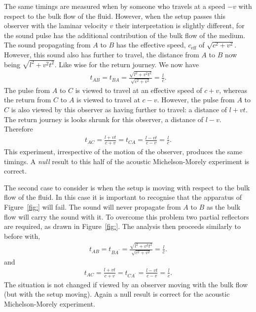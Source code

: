 \documentclass[10pt, fleqn,draft,showtrims,oldfontcommands]{article} %
\newcommand{\figref}[1]{Figure~\ref{fig:#1}}
\newcommand{\eff}{{\textrm{eff}}}
\begin{document}
The same timings are measured when by someone who travels at a speed $-v$ with respect to the bulk flow of the fluid.
However, when the setup passes this observer with the laminar velocity $v$ their interpretation is slightly different,
for the sound pulse has the additional contribution of the bulk flow of the medium.
The sound propagating from $A$ to $B$  has the effective speed, $c_\eff$ of $\sqrt{c^2 +v^2}$.
However, this sound also has further to travel, the distance from $A$ to $B$ now being $\sqrt{l^2+v^2t^2}$.
Like wise for the return journey.
We now have
\begin{align}
  t_{AB} = t_{BA} = \frac{\sqrt{l^2+v^2t^2}}{\sqrt{c^2 +v^2}} = \frac{l}{c}.
\end{align}
The pulse from $A$ to $C$ is viewed to travel at an effective speed of $c+v$, whereas the return from $C$ to $A$ is viewed to travel at $c-v$.
However, the pulse from $A$ to $C$ is also viewed by this observer as having further to travel: a distance of $l+vt$.
The return journey is looks shrunk for this observer, a distance of $l-v$.
Therefore
\begin{align}
  t_{AC} =  \frac{l+vt}{c+v}= t_{CA} =  \frac{l-vt}{c-v}= \frac{l}{c}.
\end{align}
This experiment, irrespective of the motion of the observer, produces the same timings.
A {\em null} result to this half of the acoustic Michelson-Morely experiment is correct.

The second case to consider is when the setup is moving with respect to the bulk flow of the fluid.
In this case it is important to recognise that the apparatus of \figref{} will fail.
The sound will never propagate from $A$ to $B$ as the bulk flow will carry the sound with it.
To overcome this problem two partial reflectors are required, as drawn in \figref{}.
The analysis then proceeds similarly to before with,
\begin{align}
  t_{AB} = t_{BA^\prime} =  \frac{\sqrt{l^2+v^2t^2}}{\sqrt{c^2 +v^2}} = \frac{l}{c}.
\end{align}
and 
\begin{align}
  t_{AC} =  \frac{l+vt}{c+v}= t_{CA^\prime} =  \frac{l-vt}{c-v}= \frac{l}{c}.
\end{align}
The situation is not changed if viewed by an observer moving with the bulk flow (but with the setup moving).
Again a null result is correct for the acoustic Michelson-Morely experiment.



\end{document}
